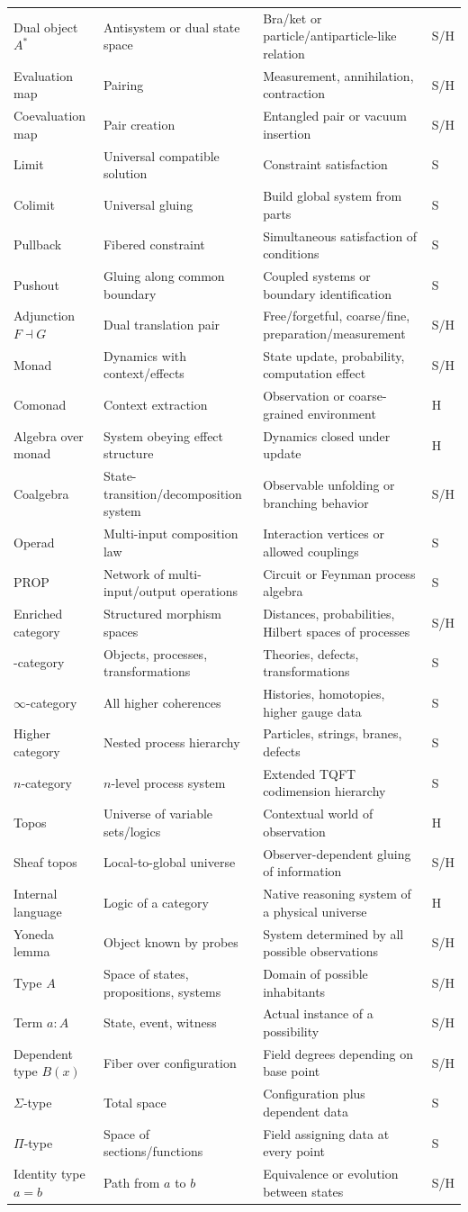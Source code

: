 \documentclass[11pt]{article}
\newcommand{\status}[1]{\textsf{#1}}
\newcommand{\entry}[4]{#1 & #2 & #3 & \status{#4}\\}
\begin{document}
\begin{longtable}{@{}>{\raggedright\arraybackslash}p{}>{\raggedright\arraybackslash}p{}>{\raggedright\arraybackslash}p{}>{\centering\arraybackslash}p{}@{}}
\entry{Dual object $A^\ast$}{Antisystem or dual state space}{Bra/ket or particle/antiparticle-like relation}{S/H}
\entry{Evaluation map}{Pairing}{Measurement, annihilation, contraction}{S/H}
\entry{Coevaluation map}{Pair creation}{Entangled pair or vacuum insertion}{S/H}
\entry{Limit}{Universal compatible solution}{Constraint satisfaction}{S}
\entry{Colimit}{Universal gluing}{Build global system from parts}{S}
\entry{Pullback}{Fibered constraint}{Simultaneous satisfaction of conditions}{S}
\entry{Pushout}{Gluing along common boundary}{Coupled systems or boundary identification}{S}
\entry{Adjunction $F\dashv G$}{Dual translation pair}{Free/forgetful, coarse/fine, preparation/measurement}{S/H}
\entry{Monad}{Dynamics with context/effects}{State update, probability, computation effect}{S/H}
\entry{Comonad}{Context extraction}{Observation or coarse-grained environment}{H}
\entry{Algebra over monad}{System obeying effect structure}{Dynamics closed under update}{H}
\entry{Coalgebra}{State-transition/decomposition system}{Observable unfolding or branching behavior}{S/H}
\entry{Operad}{Multi-input composition law}{Interaction vertices or allowed couplings}{S}
\entry{PROP}{Network of multi-input/output operations}{Circuit or Feynman process algebra}{S}
\entry{Enriched category}{Structured morphism spaces}{Distances, probabilities, Hilbert spaces of processes}{S/H}
\entry{2-category}{Objects, processes, transformations}{Theories, defects, transformations}{S}
\entry{$\infty$-category}{All higher coherences}{Histories, homotopies, higher gauge data}{S}
\entry{Higher category}{Nested process hierarchy}{Particles, strings, branes, defects}{S}
\entry{$n$-category}{$n$-level process system}{Extended TQFT codimension hierarchy}{S}
\entry{Topos}{Universe of variable sets/logics}{Contextual world of observation}{H}
\entry{Sheaf topos}{Local-to-global universe}{Observer-dependent gluing of information}{S/H}
\entry{Internal language}{Logic of a category}{Native reasoning system of a physical universe}{H}
\entry{Yoneda lemma}{Object known by probes}{System determined by all possible observations}{S/H}
\entry{Type $A$}{Space of states, propositions, systems}{Domain of possible inhabitants}{S/H}
\entry{Term $a:A$}{State, event, witness}{Actual instance of a possibility}{S/H}
\entry{Dependent type $B(x)$}{Fiber over configuration}{Field degrees depending on base point}{S/H}
\entry{$\Sigma$-type}{Total space}{Configuration plus dependent data}{S}
\entry{$\Pi$-type}{Space of sections/functions}{Field assigning data at every point}{S}
\entry{Identity type $a=b$}{Path from $a$ to $b$}{Equivalence or evolution between states}{S/H}

\end{longtable}
\end{document}
